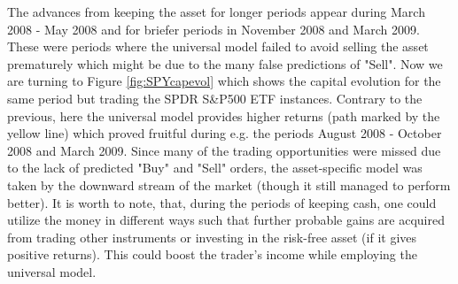 \documentclass[12pt, a4paper]{article}
\begin{document}
The advances from keeping the asset for longer periods appear during March 2008 - May 2008 and for briefer periods in November 2008 and March 2009. These were periods where the universal model failed to avoid selling the asset prematurely which might be due to the many false predictions of "Sell". Now we are turning to Figure \ref{fig:SPYcapevol} which shows the capital evolution for the same period but trading the SPDR S\&P500 ETF instances. 
Contrary to the previous, here the universal model provides higher returns (path marked by the yellow line) which proved fruitful during e.g. the periods August 2008 - October 2008 and March 2009. Since many of the trading opportunities were missed due to the lack of predicted "Buy" and "Sell" orders, the asset-specific model was taken by the downward stream of the market (though it still managed to perform better). 
It is worth to note, that, during the periods of keeping cash, one could utilize the money in different ways such that further probable gains are acquired from trading other instruments or investing in the risk-free asset (if it gives positive returns). This could boost the trader's income while employing the universal model. 
\end{document}
